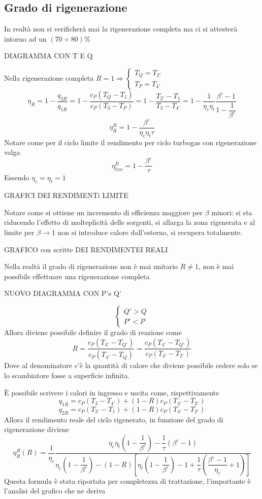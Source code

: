 \subsection{Grado di rigenerazione}
\begin{adjustwidth}{2in}{}
	In realtà non si verificherà mai la rigenerazione completa ma ci si attesterà intorno ad un $(70\div80)\%$	
	
	DIAGRAMMA CON T E Q
	
	Nella rigenerazione completa $ R=1 \Rightarrow \begin{cases}
		T_Q = T_{2'} \\ 
		T_P = T_{4'}
	\end{cases}$ 
	\[\eta_R = 1 - \dfrac{q_{2R}}{q_{1R}} = 1 - \dfrac{c_P(T_Q-T_1)}{c_P(T_3-T_P)} = 1 - \dfrac{T_{2'}-T_1}{T_3-T_{4'}} = 1 - \dfrac{1}{\eta_c\eta_t}\dfrac{\beta^\varepsilon-1}{1-\dfrac{1}{\beta^\varepsilon}}\]
	\begin{equation}\label{eq:2.7}
		\boxed{\eta^R_R = 1 - \dfrac{\beta^\varepsilon}{\eta_c\eta_t\tau}}
	\end{equation}
	Notare come per il ciclo limite il rendimento per ciclo turbogas con rigenerazione valga 
	\[\boxed{\eta^R_{lim} = 1 - \dfrac{\beta^\varepsilon}{\tau}}\]
	Essendo $\eta_c=\eta_t=1$
	
	GRAFICI DEI RENDIMENTi LIMITE
	
	Notare come si ottiene un incremento di efficienza maggiore per $\beta$ minori: si sta riducendo l'effetto di molteplicità delle sorgenti, si allarga la zona rigenerata e al limite per $\beta\rightarrow1$ non si introduce calore dall'esterno, si recupera totalmente.
	
	GRAFICO con scritte DEI RENDIMENTEI REALI
	
	Nella realtà il grado di rigenerazione non è mai unitario $R\ne1$, non è mai possibile effettuare una rigenerazione completa
	
	NUOVO DIAGRAMMA CON P'e Q'
	
	\[\begin{cases}
		Q'>Q \\
		P'<P
	\end{cases}\]
	Allora diviene possibile definire il grado di reazione come
	\[R = \dfrac{c_P(T_{4'}-T_{Q'})}{c_P(T_{4'}-T_{Q})} = \dfrac{c_P(T_{4'}-T_{Q'})}{c_P(T_{4'}-T_{2'})} \]
	Dove al denominatore c'è la quantità di calore che diviene possibile cedere solo se lo scambiatore fosse a superficie infinita. \newline 
	
	È possibile scrivere i calori in ingresso e uscita come, rispettivamente
	\[q_{1R} = c_P(T_3-T_{4'}) + (1-R)c_P(T_{4'}-T_{2'})\]
	\[q_{2R} = c_P(T_{2'}-T_1) + (1-R)c_P(T_{4'}-T_{2'})\]
	Allora il rendimento reale del ciclo rigenerato, in funzione del grado di rigenerazione diviene
	\[\eta_R^R(R) = \dfrac{1}{\eta_c}\dfrac{\eta_c\eta_t\left(1-\dfrac{1}{\beta^\varepsilon}\right) - \dfrac{1}{\tau}(\beta^\varepsilon-1)}{\eta_c\left(1-\dfrac{1}{\beta^\varepsilon}\right) - (1-R)\left[\eta_t\left(1-\dfrac{1}{\beta^\varepsilon}\right)-1+\dfrac{1}{\tau}\left(\dfrac{\beta^\varepsilon-1}{\eta_c}+1\right)\right]}\]
	Questa formula è stata riportata per completezza di trattazione, l'importante è l'analisi del grafico che ne deriva
	

\end{adjustwidth}
